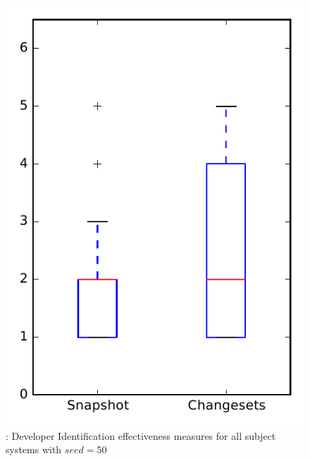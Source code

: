 
\begin{figure}
\centering
\includegraphics[height=0.4\textheight]{figures/dit_seed/rq1_overview_50}
\caption{\rtwo: Developer Identification effectiveness measures for all subject systems with $seed=50$}
\label{fig:dit_seed:rq1:overview}
\end{figure}
